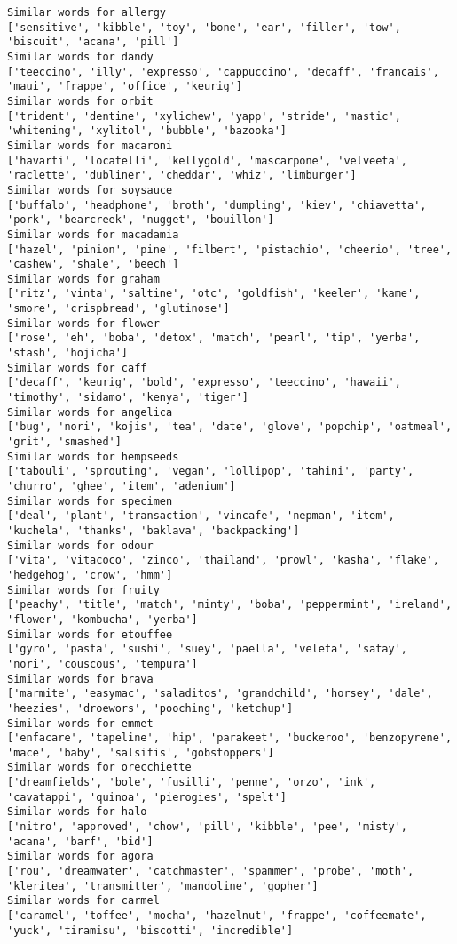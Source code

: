 \documentclass[11pt]{article}
\begin{document}
\begin{Verbatim}[commandchars=\\\{\}]
Similar words for allergy
['sensitive', 'kibble', 'toy', 'bone', 'ear', 'filler', 'tow', 'biscuit', 'acana', 'pill']
Similar words for dandy
['teeccino', 'illy', 'expresso', 'cappuccino', 'decaff', 'francais', 'maui', 'frappe', 'office', 'keurig']
Similar words for orbit
['trident', 'dentine', 'xylichew', 'yapp', 'stride', 'mastic', 'whitening', 'xylitol', 'bubble', 'bazooka']
Similar words for macaroni
['havarti', 'locatelli', 'kellygold', 'mascarpone', 'velveeta', 'raclette', 'dubliner', 'cheddar', 'whiz', 'limburger']
Similar words for soysauce
['buffalo', 'headphone', 'broth', 'dumpling', 'kiev', 'chiavetta', 'pork', 'bearcreek', 'nugget', 'bouillon']
Similar words for macadamia
['hazel', 'pinion', 'pine', 'filbert', 'pistachio', 'cheerio', 'tree', 'cashew', 'shale', 'beech']
Similar words for graham
['ritz', 'vinta', 'saltine', 'otc', 'goldfish', 'keeler', 'kame', 'smore', 'crispbread', 'glutinose']
Similar words for flower
['rose', 'eh', 'boba', 'detox', 'match', 'pearl', 'tip', 'yerba', 'stash', 'hojicha']
Similar words for caff
['decaff', 'keurig', 'bold', 'expresso', 'teeccino', 'hawaii', 'timothy', 'sidamo', 'kenya', 'tiger']
Similar words for angelica
['bug', 'nori', 'kojis', 'tea', 'date', 'glove', 'popchip', 'oatmeal', 'grit', 'smashed']
Similar words for hempseeds
['tabouli', 'sprouting', 'vegan', 'lollipop', 'tahini', 'party', 'churro', 'ghee', 'item', 'adenium']
Similar words for specimen
['deal', 'plant', 'transaction', 'vincafe', 'nepman', 'item', 'kuchela', 'thanks', 'baklava', 'backpacking']
Similar words for odour
['vita', 'vitacoco', 'zinco', 'thailand', 'prowl', 'kasha', 'flake', 'hedgehog', 'crow', 'hmm']
Similar words for fruity
['peachy', 'title', 'match', 'minty', 'boba', 'peppermint', 'ireland', 'flower', 'kombucha', 'yerba']
Similar words for etouffee
['gyro', 'pasta', 'sushi', 'suey', 'paella', 'veleta', 'satay', 'nori', 'couscous', 'tempura']
Similar words for brava
['marmite', 'easymac', 'saladitos', 'grandchild', 'horsey', 'dale', 'heezies', 'droewors', 'pooching', 'ketchup']
Similar words for emmet
['enfacare', 'tapeline', 'hip', 'parakeet', 'buckeroo', 'benzopyrene', 'mace', 'baby', 'salsifis', 'gobstoppers']
Similar words for orecchiette
['dreamfields', 'bole', 'fusilli', 'penne', 'orzo', 'ink', 'cavatappi', 'quinoa', 'pierogies', 'spelt']
Similar words for halo
['nitro', 'approved', 'chow', 'pill', 'kibble', 'pee', 'misty', 'acana', 'barf', 'bid']
Similar words for agora
['rou', 'dreamwater', 'catchmaster', 'spammer', 'probe', 'moth', 'kleritea', 'transmitter', 'mandoline', 'gopher']
Similar words for carmel
['caramel', 'toffee', 'mocha', 'hazelnut', 'frappe', 'coffeemate', 'yuck', 'tiramisu', 'biscotti', 'incredible']

\end{Verbatim}
\end{document}
